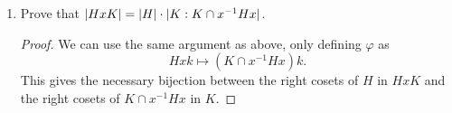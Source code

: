 \begin{enumerate}
\begin{proof}
    We have shown that $\varphi$ is a bijection and it now follows
    that
    \begin{equation*}
      \ord{A} = \ord{B}.
    \end{equation*}
    However, we know that $\ord{A}$ is the number of cosets of $K$ in
    $HxK$, so that, by Lagrange's Theorem,
    \begin{equation*}
      \frac{\ord{HxK}}{\ord{K}}
      = \ord{HxK : K} = \ord{A}
      = \ord{B} = \ord{H : H\cap xKx^{-1}}.
    \end{equation*}
    This can be rearranged to get
    \begin{equation*}
      \ord{HxK} = \ord{K}\cdot\ord{H : H\cap xKx^{-1}}
    \end{equation*}
    as desired.
  \end{proof}

\item Prove that $\lvert{HxK}\rvert = \lvert{H}\rvert\cdot\lvert{K : K\cap x^{-1}Hx}\rvert$.
  \begin{proof}
    We can use the same argument as above, only defining $\varphi$ as
    \begin{equation*}
      Hxk\mapsto (K\cap x^{-1}Hx)k.
    \end{equation*}
    This gives the necessary bijection between the right cosets of $H$
    in $HxK$ and the right cosets of $K\cap x^{-1}Hx$ in $K$.
  \end{proof}
\end{enumerate}
